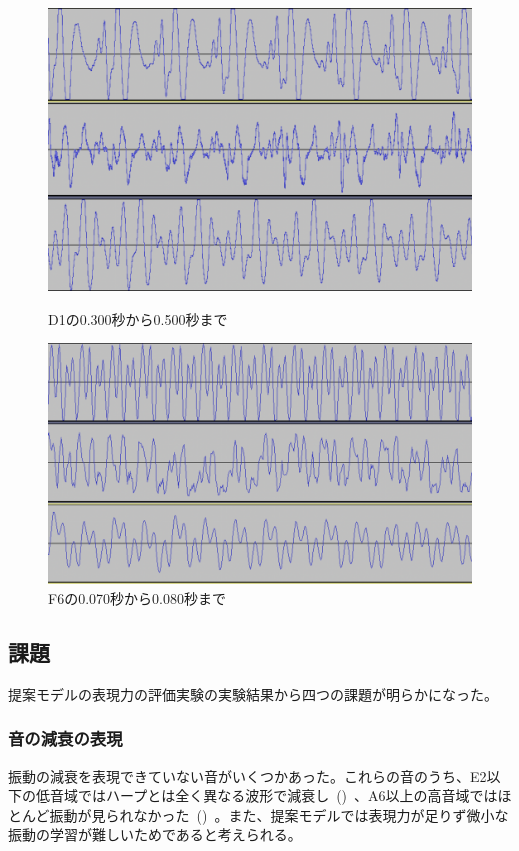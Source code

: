 \begin{figure}[b]
\centering
\begin{minipage}{0.48\columnwidth}
\centering
\includegraphics[width=0.75\columnwidth]{figure/66_22_det/d1_0300_0500.png}
\caption[D1の音波]{D1の0.300秒から0.500秒まで}
\label{fig:66_22_bad1}
\end{minipage}
\begin{minipage}{0.48\columnwidth}
\centering
\includegraphics[width=0.85\columnwidth]{figure/66_22_det/f6_0070_0080.png}
\caption[F6の音波]{F6の0.070秒から0.080秒まで}
\label{fig:66_22_bad2}
\end{minipage}
\end{figure}

\subsection{課題}

提案モデルの表現力の評価実験の実験結果から四つの課題が明らかになった。

\subsubsection{音の減衰の表現}

振動の減衰を表現できていない音がいくつかあった。これらの音のうち、E2以下の低音域ではハープとは全く異なる波形で減衰し~()~、A6以上の高音域ではほとんど振動が見られなかった~()~。また、提案モデルでは表現力が足りず微小な振動の学習が難しいためであると考えられる。

